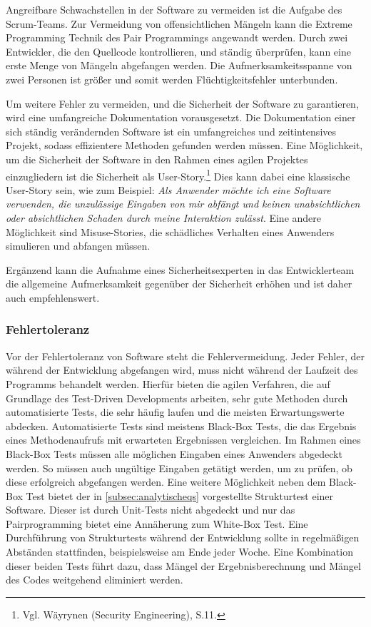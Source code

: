                 Angreifbare Schwachstellen in der Software zu vermeiden ist die Aufgabe des Scrum-Teams. Zur Vermeidung von offensichtlichen Mängeln kann die Extreme Programming Technik des Pair Programmings angewandt werden. Durch zwei Entwickler, die den Quellcode kontrollieren, und ständig überprüfen, kann eine erste Menge von Mängeln abgefangen werden. Die Aufmerksamkeitsspanne von zwei Personen ist größer und somit werden Flüchtigkeitsfehler unterbunden.

                Um weitere Fehler zu vermeiden, und die Sicherheit der Software zu garantieren, wird eine umfangreiche Dokumentation vorausgesetzt. Die Dokumentation einer sich ständig verändernden Software ist ein umfangreiches und zeitintensives Projekt, sodass effizientere Methoden gefunden werden müssen. Eine Möglichkeit, um die Sicherheit der Software in den Rahmen eines agilen Projektes einzugliedern ist die Sicherheit als User-Story.\footnote{Vgl. Wäyrynen (Security Engineering), S.11.} Dies kann dabei eine klassische User-Story sein, wie zum Beispiel: \emph{Als Anwender möchte ich eine Software verwenden, die unzulässige Eingaben von mir abfängt und keinen unabsichtlichen oder absichtlichen Schaden durch meine Interaktion zulässt}. Eine andere Möglichkeit sind Misuse-Stories, die schädliches Verhalten eines Anwenders simulieren und abfangen müssen.

                Ergänzend kann die Aufnahme eines Sicherheitsexperten in das Entwicklerteam die allgemeine Aufmerksamkeit gegenüber der Sicherheit erhöhen und ist daher auch empfehlenswert.

            \subsubsection{Fehlertoleranz}

                Vor der Fehlertoleranz von Software steht die Fehlervermeidung. Jeder Fehler, der während der Entwicklung abgefangen wird, muss nicht während der Laufzeit des Programms behandelt werden. Hierfür bieten die agilen Verfahren, die auf Grundlage des Test-Driven Developments arbeiten, sehr gute Methoden durch automatisierte Tests, die sehr häufig laufen und die meisten Erwartungswerte abdecken. Automatisierte Tests sind meistens Black-Box Tests, die das Ergebnis eines Methodenaufrufs mit erwarteten Ergebnissen vergleichen. Im Rahmen eines Black-Box Tests müssen alle möglichen Eingaben eines Anwenders abgedeckt werden. So müssen auch ungültige Eingaben getätigt werden, um zu prüfen, ob diese erfolgreich abgefangen werden.
                Eine weitere Möglichkeit neben dem Black-Box Test bietet der in \autoref{subsec:analytischeqs} vorgestellte Strukturtest einer Software. Dieser ist durch Unit-Tests nicht abgedeckt und nur das Pairprogramming bietet eine Annäherung zum White-Box Test. Eine Durchführung von Strukturtests während der Entwicklung sollte in regelmäßigen Abständen stattfinden, beispielsweise am Ende jeder Woche.
                Eine Kombination dieser beiden Tests führt dazu, dass Mängel der Ergebnisberechnung und Mängel des Codes weitgehend eliminiert werden.

